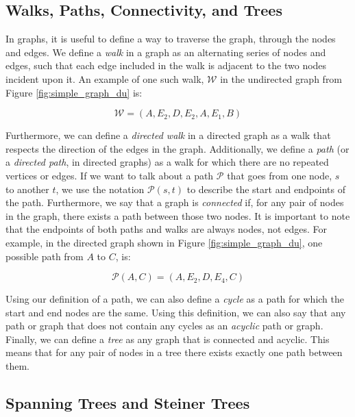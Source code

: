 \documentclass[12pt,twoside]{reedthesis}
\theoremstyle{definition}
\begin{document}
   \subsection{Walks, Paths, Connectivity, and Trees}

   In graphs, it is useful to define a way to traverse the graph, through the nodes and edges. We define a \textit{walk} in a graph as an alternating series of nodes and edges, such that each edge included in the walk is adjacent to the two nodes incident upon it. An example of one such walk, $\mathcal{W}$ in the undirected graph from Figure \ref{fig:simple_graph_du} is:\par

   \begin{equation*}
     \mathcal{W} = (A,E_2,D,E_2,A,E_1,B)
   \end{equation*}

   Furthermore, we can define a \textit{directed walk} in a directed graph as a walk that respects the direction of the edges in the graph. Additionally, we define a \textit{path} (or a \textit{directed path}, in directed graphs) as a walk for which there are no repeated vertices or edges. If we want to talk about a path $\mathcal{P}$ that goes from one node, $s$ to another $t$, we use the notation $\mathcal{P}(s,t)$ to describe the start and endpoints of the path. Furthermore, we say that a graph is \textit{connected} if, for any pair of nodes in the graph, there exists a path between those two nodes. It is important to note that the endpoints of both paths and walks are always nodes, not edges. For example, in the directed graph shown in Figure \ref{fig:simple_graph_du}, one possible path from $A$ to $C$, is:\par

   \begin{equation*}
     \mathcal{P}(A,C) = (A,E_2,D,E_4,C)
   \end{equation*}

   Using our definition of a path, we can also define a \textit{cycle} as a path for which the start and end nodes are the same. Using this definition, we can also say that any path or graph that does not contain any cycles as an \textit{acyclic} path or graph. Finally, we can define a \textit{tree} as any graph that is connected and acyclic. This means that for any pair of nodes in a tree there exists exactly one path between them.\par

   \subsection{Spanning Trees and Steiner Trees}
\end{document}
